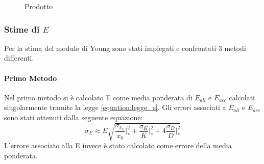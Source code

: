 \documentclass[a4paper,11pt,oneside]{article}
\begin{document}
\begin{figure}[h!]
    \centering
        \label{fig:prodotto}
        \caption{Prodotto}
\end{figure}

\subsubsection*{Stime di $E$}
Per la stima del modulo di Young sono stati impiegati e confrontati 3 metodi differenti.

\paragraph{Primo Metodo} Nel primo metodo si è calcolato E come media ponderata di $E_{all}$ e $E_{acc}$ calcolati singolarmente tramite la legge \ref{equation:legge_e}. Gli errori associati a $E_{all}$ e $E_{acc}$ sono stati ottenuti dalla seguente equazione:
\begin{equation}
    \label{eq:propagazione_particolare}
    \sigma_{E} \approx E\sqrt{\frac{\sigma_{x_{0}}}{x_{0}}\Big|_{\ast}^2+\frac{\sigma_{K}}{K}\Big|_{\ast}^2+4\frac{\sigma_{D}}{D}\Big|_{\ast}^2}
\end{equation}
L'errore associato alla E invece è stato calcolato come errore della media ponderata.
\end{document}
